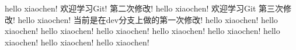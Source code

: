 hello xiaochen! 欢迎学习Git! 第二次修改!
hello xiaochen! 欢迎学习Git  第三次修改!
hello xiaochen!  当前是在dev分支上做的第一次修改!
hello xiaochen!
hello xiaochen!
hello xiaochen!
hello xiaochen!
hello xiaochen!
hello xiaochen!
hello xiaochen!
hello xiaochen!
hello xiaochen!
